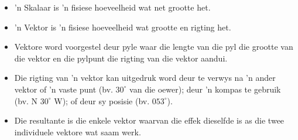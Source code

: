 \begin{itemize}
\item  'n Skalaar is  'n fisiese hoeveelheid wat net grootte het.
\item  'n Vektor is  'n fisiese hoeveelheid wat grootte en rigting het.
\item Vektore word voorgestel deur pyle waar die lengte van die pyl die grootte van die vektor en die pylpunt die rigting van die vektor aandui.
\item Die rigting van  'n vektor kan uitgedruk word deur te verwys na  'n ander vektor of  'n vaste punt (bv. $30^{\circ}$ van die oewer); deur  'n kompas te gebruik (bv. N $30^\circ$ W); of deur sy posisie (bv. $053 ^\circ$).
\item Die resultante is die enkele vektor waarvan die effek dieselfde is as die twee individuele vektore wat saam werk. 
\end{itemize}
